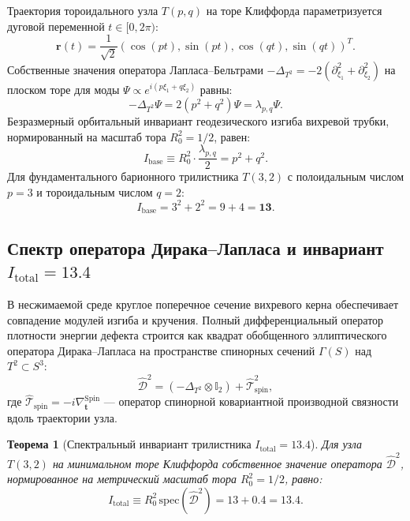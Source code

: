 \documentclass[11pt,a4paper]{article}
\newtheorem{theorem}{Теорема}[section]
\theoremstyle{definition}
\theoremstyle{remark}
\begin{document}
Траектория тороидального узла $T(p,q)$ на торе Клиффорда параметризуется дуговой переменной $t \in [0, 2\pi)$:
\begin{equation}
    \mathbf{r}(t) = \frac{1}{\sqrt{2}} \left( \cos(pt), \sin(pt), \cos(qt), \sin(qt) \right)^T.
\end{equation}
Собственные значения оператора Лапласа--Бельтрами $-\Delta_{T^2} = -2(\partial_{\xi_1}^2 + \partial_{\xi_2}^2)$ на плоском торе для моды $\Psi \propto e^{i(p\xi_1 + q\xi_2)}$ равны:
\begin{equation}
    -\Delta_{T^2} \Psi = 2 (p^2 + q^2) \Psi = \lambda_{p,q} \Psi.
\end{equation}
Безразмерный орбитальный инвариант геодезического изгиба вихревой трубки, нормированный на масштаб тора $R_0^2 = 1/2$, равен:
\begin{equation}
    I_{\mathrm{base}} \equiv R_0^2 \cdot \frac{\lambda_{p,q}}{2} = p^2 + q^2.
    \label{eq:i_base}
\end{equation}
Для фундаментального барионного трилистника $T(3,2)$ с полоидальным числом $p=3$ и тороидальным числом $q=2$:
\begin{equation}
    I_{\mathrm{base}} = 3^2 + 2^2 = 9 + 4 = \mathbf{13}.
\end{equation}

\subsection{Спектр оператора Дирака--Лапласа и инвариант $I_{\mathrm{total}} = 13.4$}
В несжимаемой среде круглое поперечное сечение вихревого керна обеспечивает совпадение модулей изгиба и кручения. Полный дифференциальный оператор плотности энергии дефекта строится как квадрат обобщенного эллиптического оператора Дирака--Лапласа на пространстве спинорных сечений $\Gamma(S)$ над $T^2 \subset S^3$:
\begin{equation}
    \hat{\mathcal{D}}^2 = \left( -\Delta_{T^2} \otimes \mathbb{I}_2 \right) + \hat{\mathcal{T}}_{\mathrm{spin}}^2,
    \label{eq:dirac_laplace_operator}
\end{equation}
где $\hat{\mathcal{T}}_{\mathrm{spin}} = -i \nabla_{\mathbf{t}}^{\mathrm{Spin}}$ --- оператор спинорной ковариантной производной связности вдоль траектории узла.

\begin{theorem}[Спектральный инвариант трилистника $I_{\mathrm{total}} = 13.4$]
Для узла $T(3,2)$ на минимальном торе Клиффорда собственное значение оператора $\hat{\mathcal{D}}^2$, нормированное на метрический масштаб тора $R_0^2 = 1/2$, равно:
\begin{equation}
    I_{\mathrm{total}} \equiv R_0^2 \, \mathrm{spec}(\hat{\mathcal{D}}^2) = 13 + 0.4 = \mathbf{13.4}.
    \label{eq:i_total_13_4}
\end{equation}
\end{theorem}
\end{document}
